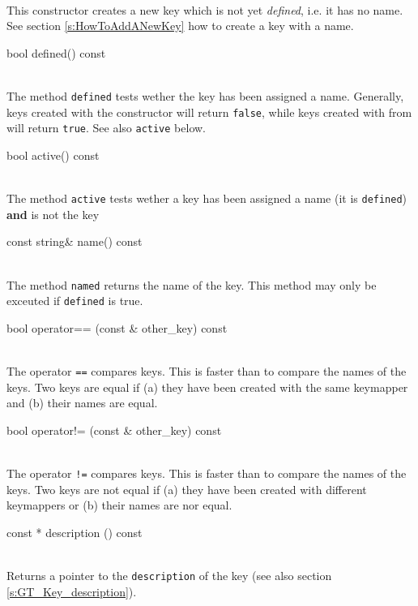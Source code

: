 \documentclass[twoside,fleqn]{report}
\begin{document}
\begin{Cdefinition}
  
  

  \item[\GT{Key()}] \strut\\
  This constructor creates a new key which is not yet
  \emph{defined}, i.e. it has no name. See section
  \ref{s:HowToAddANewKey} how to create a key with a name.
  

  \item[bool defined() const] \strut\\
  The method \texttt{defined} tests wether the key has been
  assigned a name. Generally, keys created with the constructor
   will return \texttt{false}, while keys created with
  from  will return \texttt{true}. See also
  \texttt{active} below.

  \item[bool active() const] \strut\\
  The method \texttt{active} tests wether a key has been assigned
  a name (it is \texttt{defined}) \textbf{and} is not the key
  
  \item[const string\& name() const] \strut\\
  The method \texttt{named} returns the name of the key. This
  method may only be exceuted if \texttt{defined} is true.
  

  \item[bool operator== (const \GT{Key}\& other\_key) const] \strut\\
  The operator \texttt{==} compares keys. This is faster than to
  compare the names of the keys. Two keys are equal if (a) they
  have been created with the same keymapper and (b) their names
  are equal.
  

  \item[bool operator!= (const \GT{Key}\& other\_key) const] \strut\\
  The operator \texttt{!=} compares keys. This is faster than to
  compare the names of the keys. Two keys are not equal if (a)
  they have been created with different keymappers or (b) their
  names are nor equal.
  

  \item[const \GT{Key\_class}* description () const] \strut\\
  Returns a pointer to the \texttt{description} of the key (see
  also section \ref{s:GT_Key_description}).

\end{Cdefinition}
\end{document}

